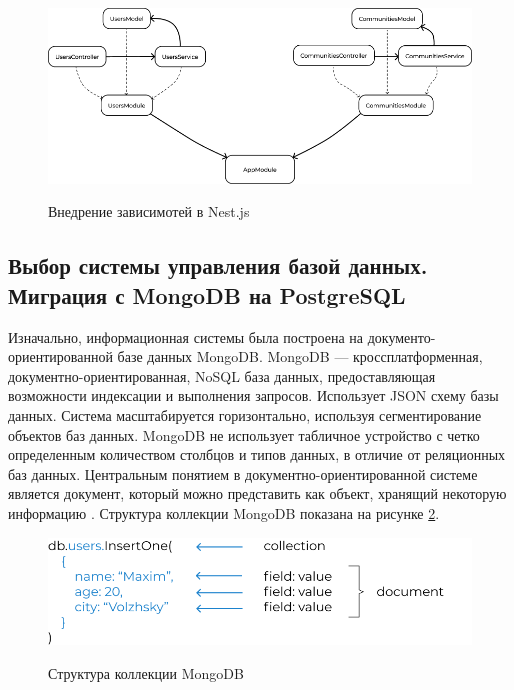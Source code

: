 \begin{figure}[H]
\begin{center}
\includegraphics[width=1.0\hsize]{fig/nestjs-ioc.png}\\[2mm]
\caption{Внедрение зависимотей в Nest.js}\label{fig:nestjs-ioc}
\end{center}
\end{figure}

\subsection{Выбор системы управления базой данных. Миграция с MongoDB на PostgreSQL}

Изначально, информационная системы была построена на документо-ориентированной базе данных MongoDB. MongoDB — кроссплатформенная, документно-ориентированная, NoSQL база данных, предоставляющая возможности индексации и выполнения запросов. Использует JSON схему базы данных. Система масштабируется горизонтально, используя сегментирование объектов баз данных. MongoDB не использует табличное устройство с четко определенным количеством столбцов и типов данных, в отличие от реляционных баз данных. Центральным понятием в документно-ориентированной системе является документ, который можно представить как объект, хранящий некоторую информацию \cite{Mongo}. Структура коллекции MongoDB показана на рисунке \ref{fig:mongodb}.

\begin{figure}[H]
\begin{center}
\includegraphics[width=1.0\hsize]{fig/mongodb.png}\\[2mm]
\caption{Структура коллекции MongoDB}\label{fig:mongodb}
\end{center}
\end{figure}

